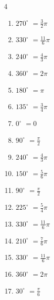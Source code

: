 \begin{multicols}{4}
\begin{enumerate}
\columnbreak %

  \item $\displaystyle 270^{\circ}$
        $\displaystyle =\frac{3}{2}\pi$

  \item $\displaystyle 330^{\circ}$
        $\displaystyle =\frac{11}{6}\pi$

  \item $\displaystyle 240^{\circ}$
        $\displaystyle =\frac{4}{3}\pi$

  \item $\displaystyle 360^{\circ}$
        $\displaystyle =2\pi$

  \item $\displaystyle 180^{\circ}$
        $\displaystyle =\pi$

  \item $\displaystyle 135^{\circ}$
        $\displaystyle =\frac{3}{4}\pi$

  \item $\displaystyle 0^{\circ}$
        $\displaystyle =0$

  \item $\displaystyle 90^{\circ}$
        $\displaystyle =\frac{\pi}{2}$

  \item $\displaystyle 240^{\circ}$
        $\displaystyle =\frac{4}{3}\pi$

  \item $\displaystyle 150^{\circ}$
        $\displaystyle =\frac{5}{6}\pi$

  \item $\displaystyle 90^{\circ}$
        $\displaystyle =\frac{\pi}{2}$

  \item $\displaystyle 225^{\circ}$
        $\displaystyle =\frac{5}{4}\pi$

  \item $\displaystyle 330^{\circ}$
        $\displaystyle =\frac{11}{6}\pi$

  \item $\displaystyle 210^{\circ}$
        $\displaystyle =\frac{7}{6}\pi$

  \item $\displaystyle 330^{\circ}$
        $\displaystyle =\frac{11}{6}\pi$

  \item $\displaystyle 360^{\circ}$
        $\displaystyle =2\pi$

  \item $\displaystyle 30^{\circ}$
        $\displaystyle =\frac{\pi}{6}$


\end{enumerate}
\end{multicols}
